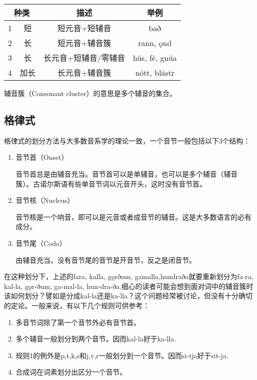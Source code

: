 \begin{table}[H]
  \centering
  \begin{tabular}{@{}cccc@{}}
    \toprule
    \multicolumn{2}{c}{\textbf{种类}} & \textbf{描述} & \textbf{举例}                         \\ \midrule
    1                                 & 短            & 短元音+短辅音        & bað            \\
    2                                 & 长            & 短元音+辅音簇        & rann, ǫnd      \\
    3                                 & 长            & 长元音+短辅音/零辅音 & hús, fé, gnúa  \\
    4                                 & 加长          & 长元音+辅音簇        & nótt,   blástr \\ \bottomrule
  \end{tabular}
\end{table}
辅音簇（Consonant cluster）的意思是多个辅音的集合。

\subsection{格律式}

格律式的划分方法与大多数音系学的理论一致，一个音节一般包括以下3个结构：
\begin{enumerate}
  \item 音节首（Onset）

        音节首总是由辅音充当。音节首可以是单辅音，也可以是多个辅音（辅音簇）。古诺尔斯语有些单音节词以元音开头，这时没有音节首。
  \item 音节核（Nucleus）

        音节核是一个响音，即可以是元音或者成音节的辅音。这是大多数语言的必有成分。
  \item 音节尾（Coda）

        由辅音充当，没有音节尾的音节是开音节，反之是闭音节。

\end{enumerate}

在这种划分下，上述的fara, kalla, gǫrðum, gamalla,hundraða就要重新划分为fa-ra, kal-la, gǫr-ðum, ga-mal-la, hun-dra-ða.细心的读者可能会想到面对词中的辅音簇时该如何划分？譬如是分成kal-la还是ka-lla？这个问题经常被讨论，但没有十分确切的定论。一般来说，有以下几个规则可供参考：

\begin{info}
  \begin{enumerate}
    \item 多音节词除了第一个音节外必有音节首。
    \item 多个辅音一般划分到两个音节。因而kal-la好于ka-lla.
    \item 规则1的例外是p,t,k,s和j,v,r一般划分到一个音节。因而si-tja好于sit-ja.
    \item 合成词在词素划分出区分一个音节。
  \end{enumerate}
\end{info}

